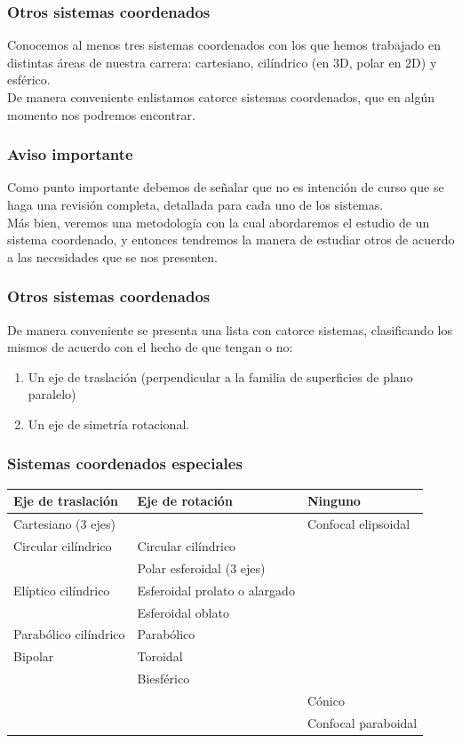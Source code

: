 \documentclass[12pt]{beamer}
\begin{document}
\begin{frame}
\frametitle{Otros sistemas coordenados}
Conocemos al menos tres sistemas coordenados con los que hemos trabajado en distintas áreas de nuestra carrera: cartesiano, cilíndrico (en 3D, polar en 2D) y esférico.
\\
\bigskip
\pause
De manera conveniente enlistamos catorce sistemas coordenados, que en algún momento nos podremos encontrar.
\end{frame}
\begin{frame}
\frametitle{Aviso importante}
Como punto importante debemos de señalar que no es intención de curso que se haga una revisión completa, detallada para cada uno de los sistemas.
\\
\bigskip
\pause
Más bien, veremos una metodología con la cual abordaremos el estudio de un sistema coordenado, y entonces tendremos la manera de estudiar otros de acuerdo a las necesidades que se nos presenten.
\end{frame}
\begin{frame}
\frametitle{Otros sistemas coordenados}
De manera conveniente se presenta una lista con catorce sistemas, clasificando los mismos de acuerdo con el hecho de que tengan o no:
\begin{enumerate}[<+->]
\item Un eje de traslación (perpendicular a la familia de superficies de plano paralelo)
\item Un eje de simetría rotacional.
\end{enumerate}
\end{frame}
\begin{frame}
\frametitle{Sistemas coordenados especiales}
\fontsize{8}{8}\selectfont
{
\renewcommand{\arraystretch}{1.2}
\begin{table}[H]
\centering
\begin{tabular}{p{3cm} p{4cm} p{2.5cm}}
Eje de traslación & Eje de rotación & Ninguno \\ \hline
Cartesiano ($3$ ejes) & & Confocal elipsoidal \\
Circular cilíndrico & Circular cilíndrico & \\
& Polar esferoidal ($3$ ejes) & \\
Elíptico cilíndrico & Esferoidal prolato o alargado & \\
& Esferoidal oblato & \\
Parabólico cilíndrico & Parabólico & \\
Bipolar & Toroidal & \\
& Biesférico & \\[0.5em]
& & Cónico \\
& & Confocal paraboidal \\
\end{tabular}
\end{table}
}
\end{frame}
\end{document}

